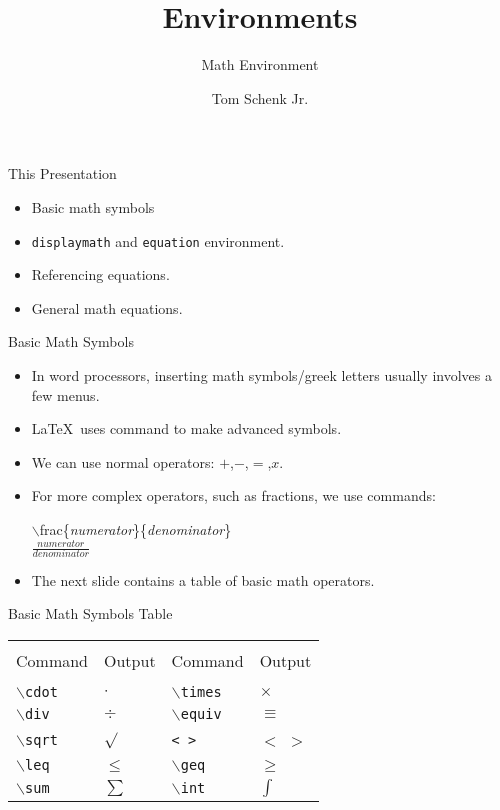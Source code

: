 \documentclass[pdf]{prosper}
\title{Environments}
\subtitle{Math Environment}
\author{Tom Schenk Jr.}		%
\begin{document}
\maketitle
\begin{slide}{This Presentation}
	\begin{itemize}
		\item Basic math symbols
		\item \texttt{displaymath} and \texttt{equation} environment.
		\item Referencing equations.
		\item General math equations.
	\end{itemize}
\end{slide}
\begin{slide}{Basic Math Symbols}
	\begin{itemize}
		\item In word processors, inserting math symbols/greek letters usually involves a few menus.
		\item \LaTeX\ uses command to make advanced symbols.
		\item We can use normal operators: $+$,$-$,$=$,$x$.
		\item For more complex operators, such as fractions, we use commands:
			\begin{center}
				$\backslash$frac\{\textit{numerator}\}\{\textit{denominator}\} \\
				$\frac{\textit{numerator}}{\textit{denominator}}$
			\end{center}
		\item The next slide contains a table of basic math operators.
	\end{itemize}
\end{slide}
\begin{slide}{Basic Math Symbols Table}
	\begin{center}
		\begin{tabular}{l l l l}
			\hline \\
			Command & Output & Command & Output\\
			\hline \\
			\texttt{$\backslash$cdot} & $\cdot$ & \texttt{$\backslash$times} & $\times$ \\
			\texttt{$\backslash$div} & $\div$ & \texttt{$\backslash$equiv} & $\equiv$ \\ 
			\texttt{$\backslash$sqrt} & $\sqrt{}$ & \texttt{< >} & $<$ $>$ \\
			\texttt{$\backslash$leq} & $\leq$ & \texttt{$\backslash$geq} & $\geq$ \\
			\texttt{$\backslash$sum} & $\sum$ & \texttt{$\backslash$int} & $\int$ \\
		\end{tabular}
	\end{center}
\end{slide}
\end{document}
